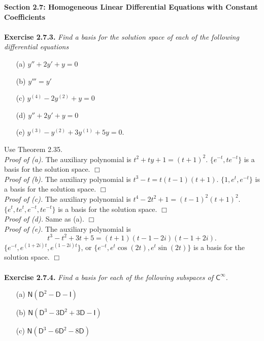 \documentclass{article}
\begin{document}



\textbf{\large Section 2.7: Homogeneous Linear Differential Equations
with Constant Coefficients} \\\\



\textbf{Exercise 2.7.3.}
\emph{Find a basis for the solution space of each of the following differential
equations}
\begin{enumerate}
\item[(a)]
$y''+2y'+y = 0$
\item[(b)]
$y'''=y'$
\item[(c)]
$y^{(4)} - 2y^{(2)} + y = 0$
\item[(d)]
$y''+2y'+y = 0$
\item[(e)]
$y^{(3)} - y^{(2)} + 3y^{(1)} + 5y = 0$. \\
\end{enumerate}

Use Theorem 2.35. \\

\emph{Proof of (a).}
The auxiliary polynomial is $t^2+ty+1 = (t+1)^2$.
$\{ e^{-t}, te^{-t} \}$ is a basis for the solution space.
$\Box$ \\

\emph{Proof of (b).}
The auxiliary polynomial is $t^3-t = t(t-1)(t+1)$.
$\{ 1, e^{t}, e^{-t} \}$ is a basis for the solution space.
$\Box$ \\

\emph{Proof of (c).}
The auxiliary polynomial is $t^4-2t^2+1 = (t-1)^2(t+1)^2$.
$\{ e^{t}, te^{t}, e^{-t}, te^{-t} \}$ is a basis for the solution space.
$\Box$ \\

\emph{Proof of (d).}
Same as (a).
$\Box$ \\

\emph{Proof of (e).}
The auxiliary polynomial is $$t^3-t^2+3t+5 = (t+1)(t-1-2i)(t-1+2i).$$
$\{ e^{-t}, e^{(1+2i)t}, e^{(1-2i)t} \}$,
or $\{ e^{-t}, e^{t}\cos(2t), e^{t}\sin(2t) \}$
is a basis for the solution space.
$\Box$ \\\\






\textbf{Exercise 2.7.4.}
\emph{Find a basis for each of the following subspaces of $\mathsf{C}^{\infty}$.}
\begin{enumerate}
\item[(a)]
$\mathsf{N}(\mathsf{D}^2-\mathsf{D}-\mathsf{I})$
\item[(b)]
$\mathsf{N}(\mathsf{D}^3-3\mathsf{D}^2+3\mathsf{D}-\mathsf{I})$
\item[(c)]
$\mathsf{N}(\mathsf{D}^3-6\mathsf{D}^2-8\mathsf{D})$ \\
\end{enumerate}
\end{document}
